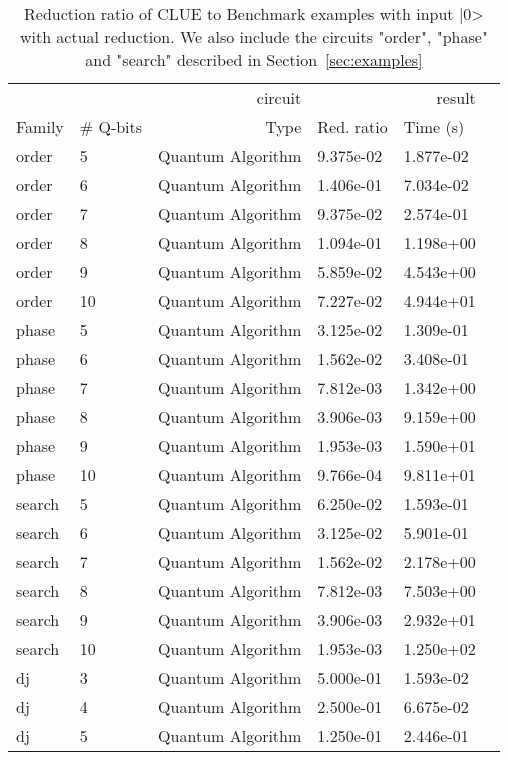 \begin{table}
\caption{Reduction ratio of CLUE to Benchmark examples with input |0> with actual reduction. We also include the 
circuits "order", "phase" and "search" described in Section~\ref{sec:examples}}
\label{table:benchmark}
\begin{tabular}{llrlll}
\toprule
\multicolumn{3}{r}{circuit} & \multicolumn{2}{r}{result} \\
Family & \# Q-bits & Type & Red. ratio & Time (s) \\
\midrule
order & 5 & Quantum Algorithm & 9.375e-02 & 1.877e-02 \\
order & 6 & Quantum Algorithm & 1.406e-01 & 7.034e-02 \\
order & 7 & Quantum Algorithm & 9.375e-02 & 2.574e-01 \\
order & 8 & Quantum Algorithm & 1.094e-01 & 1.198e+00 \\
order & 9 & Quantum Algorithm & 5.859e-02 & 4.543e+00 \\
order &10 & Quantum Algorithm & 7.227e-02 & 4.944e+01 \\
\midrule
phase & 5 & Quantum Algorithm & 3.125e-02 & 1.309e-01 \\
phase & 6 & Quantum Algorithm & 1.562e-02 & 3.408e-01 \\
phase & 7 & Quantum Algorithm & 7.812e-03 & 1.342e+00 \\
phase & 8 & Quantum Algorithm & 3.906e-03 & 9.159e+00 \\
phase & 9 & Quantum Algorithm & 1.953e-03 & 1.590e+01 \\
phase &10 & Quantum Algorithm & 9.766e-04 & 9.811e+01 \\
\midrule
search & 5 & Quantum Algorithm & 6.250e-02 & 1.593e-01 \\
search & 6 & Quantum Algorithm & 3.125e-02 & 5.901e-01 \\
search & 7 & Quantum Algorithm & 1.562e-02 & 2.178e+00 \\
search & 8 & Quantum Algorithm & 7.812e-03 & 7.503e+00 \\
search & 9 & Quantum Algorithm & 3.906e-03 & 2.932e+01 \\
search &10 & Quantum Algorithm & 1.953e-03 & 1.250e+02 \\
\midrule
dj & 3 & Quantum Algorithm & 5.000e-01 & 1.593e-02 \\
dj & 4 & Quantum Algorithm & 2.500e-01 & 6.675e-02 \\
dj & 5 & Quantum Algorithm & 1.250e-01 & 2.446e-01 \\

\end{tabular}
\end{table}
